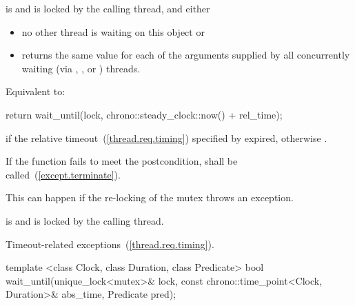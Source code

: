 \begin{itemdescr}
\pnum
\precondition {} is  and 
is locked by the calling thread, and either
\begin{itemize}
\item no other thread is waiting on this  object or
\item {} returns the same value for each of the  arguments
supplied by all concurrently waiting (via , , or
) threads.
\end{itemize}

\pnum
\effects Equivalent to:
\begin{codeblock}
return wait_until(lock, chrono::steady_clock::now() + rel_time);
\end{codeblock}

\pnum
\returns {} if
the relative timeout~(\ref{thread.req.timing}) specified by  expired,
otherwise .

\pnum
\remarks
If the function fails to meet the postcondition, 
shall be called~(\ref{except.terminate}).
\begin{note} This can happen if the re-locking of the mutex throws an exception. \end{note}

\pnum
\postcondition {} is  and 
is locked by the calling thread.

\pnum
\throws Timeout-related
exceptions~(\ref{thread.req.timing}).

\end{itemdescr}

%
%
\begin{itemdecl}
template <class Clock, class Duration, class Predicate>
  bool wait_until(unique_lock<mutex>& lock,
                  const chrono::time_point<Clock, Duration>& abs_time,
                  Predicate pred);
\end{itemdecl}

